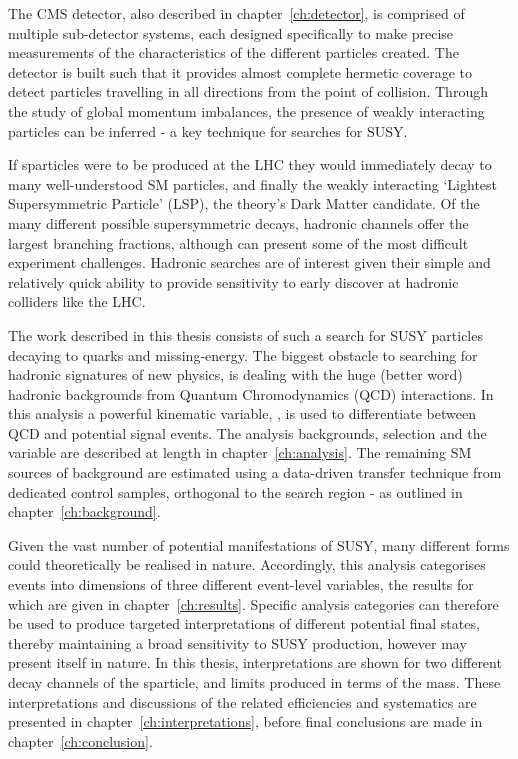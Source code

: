 The CMS detector, also described in chapter~\ref{ch:detector}, is comprised of
multiple sub-detector systems, each designed
specifically to make precise measurements of the characteristics of the
different particles created. The detector is built such that it provides almost
complete hermetic coverage to detect particles travelling in all directions
from the point of collision. Through the study of global momentum imbalances,
the presence of weakly interacting particles can be inferred - a key technique
for searches for SUSY.

If sparticles were to be produced at the LHC they would immediately decay to
many well-understood SM particles, and finally the weakly interacting `Lightest
Supersymmetric Particle' (LSP), the theory's Dark Matter candidate. Of the many
different possible supersymmetric decays, hadronic channels offer the largest
branching fractions, although can present some of the most difficult experiment
challenges. Hadronic searches are of interest given their simple and relatively
quick ability to provide sensitivity to early discover at hadronic colliders
like the LHC.

The work described in this thesis consists of such a search for SUSY particles
decaying to quarks and missing-energy. The biggest obstacle to
searching for hadronic signatures of new physics, is dealing with the huge
(better word) hadronic backgrounds from Quantum Chromodynamics (QCD)
interactions. In this
analysis a powerful kinematic variable, \alphat, is used to differentiate
between QCD and potential signal events. The analysis backgrounds, selection and
the \alphat variable are described at length in chapter~\ref{ch:analysis}. The
remaining SM sources of background
are estimated using a data-driven transfer technique from dedicated control
samples, orthogonal to the search region - as outlined in
chapter~\ref{ch:background}.

Given the vast number of potential manifestations of SUSY, many different forms
could theoretically be realised in nature. Accordingly, this analysis
categorises events into dimensions of three different event-level variables,
the results for which are given in chapter~\ref{ch:results}.
Specific analysis categories can therefore be used to produce targeted
interpretations of different potential final states, thereby maintaining a broad
sensitivity to SUSY production, however may present itself in nature. In this
thesis,
interpretations are shown for two different decay channels of the \sTop
sparticle, and limits produced in terms of the \sTop mass. These interpretations
and discussions of the related efficiencies and systematics are presented in
chapter~\ref{ch:interpretations}, before final conclusions are made in
chapter~\ref{ch:conclusion}.


